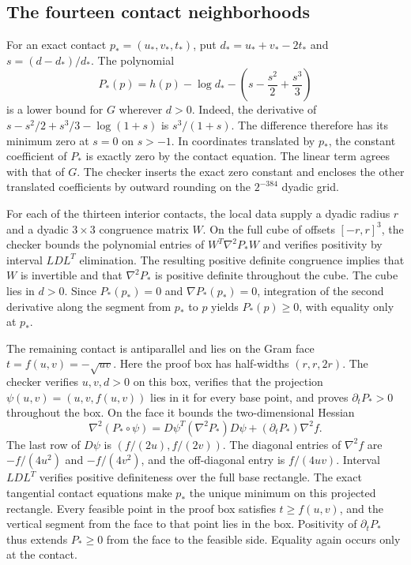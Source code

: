 \documentclass[11pt,letterpaper]{article}
\theoremstyle{remark}
\begin{document}
\subsection{The fourteen contact neighborhoods}

For an exact contact \(p_*=(u_*,v_*,t_*)\), put \(d_*=u_*+v_*-2t_*\)
and \(s=(d-d_*)/d_*\). The polynomial
\begin{equation}
 P_*(p)=h(p)-\log d_*-\left(s-\frac{s^2}{2}+\frac{s^3}{3}\right)
 \label{eq:n12-cover-cubic}
\end{equation}
is a lower bound for \(G\) wherever \(d>0\). Indeed, the derivative of
\(s-s^2/2+s^3/3-\log(1+s)\) is \(s^3/(1+s)\). The difference therefore
has its minimum zero at \(s=0\) on \(s>-1\). In coordinates translated
by \(p_*\), the constant coefficient of \(P_*\) is exactly zero by
the contact equation. The linear term agrees with that of \(G\).
The checker inserts the exact zero constant and encloses the other
translated coefficients by outward rounding on the \(2^{-384}\)
dyadic grid.

For each of the thirteen interior contacts, the local data supply a
dyadic radius \(r\) and a dyadic \(3\times3\) congruence matrix \(W\).
On the full cube of offsets \([-r,r]^3\), the checker bounds the
polynomial entries of \(W^T\nabla^2P_*W\) and verifies positivity
by interval \(LDL^T\) elimination. The resulting positive definite
congruence implies that \(W\) is invertible and that \(\nabla^2P_*\)
is positive definite throughout the cube. The cube lies in \(d>0\).
Since \(P_*(p_*)=0\) and \(\nabla P_*(p_*)=0\), integration of the
second derivative along the segment from \(p_*\) to \(p\) yields
\(P_*(p)\ge0\), with equality only at \(p_*\).

The remaining contact is antiparallel and lies on the Gram face
\(t=f(u,v)=-\sqrt{uv}\). Here the proof box has half-widths
\((r,r,2r)\). The checker verifies \(u,v,d>0\) on this box, verifies
that the projection \(\psi(u,v)=(u,v,f(u,v))\) lies in it for every
base point, and proves \(\partial_tP_*>0\) throughout the box.
On the face it bounds the two-dimensional Hessian
\[
 \nabla^2(P_*\circ\psi)
   =D\psi^T(\nabla^2P_*)D\psi
       +(\partial_tP_*)\nabla^2f.
\]
The last row of \(D\psi\) is \((f/(2u),f/(2v))\). The diagonal
entries of \(\nabla^2f\) are \(-f/(4u^2)\) and \(-f/(4v^2)\),
and the off-diagonal entry is \(f/(4uv)\). Interval \(LDL^T\)
verifies positive definiteness over the full base rectangle.
The exact tangential contact equations make \(p_*\) the unique
minimum on this projected rectangle. Every feasible point in the
proof box satisfies \(t\ge f(u,v)\), and the vertical segment from
the face to that point lies in the box. Positivity of
\(\partial_tP_*\) thus extends \(P_*\ge0\) from the face to the
feasible side. Equality again occurs only at the contact.
\end{document}
